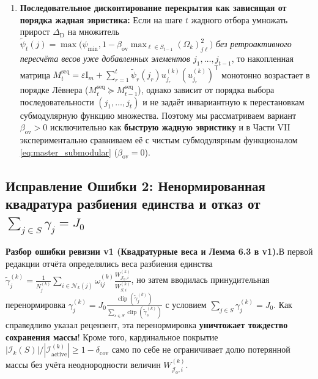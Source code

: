 \documentclass[11pt,a4paper]{article}
\newcommand{\Id}{\mathrm{I}}
\newcommand{\T}{^{\mathsf{T}}}
\newcommand{\II}{\mathcal{I}}
\newcommand{\JJJ}{\mathcal{J}}
\DeclareMathOperator{\clip}{clip}
\theoremstyle{definition}
\theoremstyle{remark}
\newcommand{\auditbox}[2]{%
  \vspace{6pt}\noindent\colorbox{warnbg}{%
    \parbox{\dimexpr\textwidth-2\fboxsep\relax}{%
      \vspace{4pt}\textbf{\color{accent}#1.}\hspace{0.4em}#2\vspace{4pt}%
    }%
  }\vspace{6pt}%
}
\begin{document}
\begin{enumerate}
    \begin{equation}\label{eq:marginal_gain}
        \Delta_{\mathrm{D}}^{\mathrm{exact}}(j \mid S_{t-1}) = \log\Bigl(1 + (u_j^{(k)})\T M_{t-1}^{-1} u_j^{(k)}\Bigr) \ge 0, \qquad \Delta_{\mathrm{mass}}(j \mid S_{t-1}) = \frac{\sum_{i \in \mathcal{N}_k(j) \setminus \II_k(S_{t-1})} W_{\JJJ_0, i}^{(k)}}{\sum_{i \in \II_{\mathrm{active}}^{(k)}} W_{\JJJ_0, i}^{(k)}} \ge 0.
    \end{equation}
    Заметим, что пространственное разнесение центров в \eqref{eq:master_submodular} достигается \emph{естественным субмодулярным путём}: если центр $j$ дублирует уже выбранный центр $\ell \in S_{t-1}$ ($\mathcal{N}_k(j) = \mathcal{N}_k(\ell)$), то его прирост покрытия тождественно равен нулю ($\Delta_{\mathrm{mass}}(j \mid S_{t-1}) = 0$), тогда как непокрытые области получают положительный бонус $\nu_{\mathrm{cov}} \Delta_{\mathrm{mass}}(j \mid S_{t-1}) > 0$!
    \item \textbf{Последовательное дисконтирование перекрытия как зависящая от порядка жадная эвристика:}
    Если на шаге $t$ жадного отбора умножать прирост $\Delta_{\mathrm{D}}$ на множитель $\tilde{\psi}_t(j) = \max\bigl(\psi_{\min}, 1 - \beta_{\mathrm{ov}}\max_{\ell \in S_{t-1}}(\Omega_k)_{j\ell}^2\bigr)$ \emph{без ретроактивного пересчёта весов уже добавленных элементов $j_1, \ldots, j_{t-1}$}, то накопленная матрица $M_t^{\mathrm{seq}} = \varepsilon \Id_m + \sum_{r=1}^t \tilde{\psi}_r(j_r) u_{j_r}^{(k)}(u_{j_r}^{(k)})\T$ монотонно возрастает в порядке Лёвнера ($M_t^{\mathrm{seq}} \succeq M_{t-1}^{\mathrm{seq}}$), однако зависит от порядка выбора последовательности $(j_1, \ldots, j_t)$ и не задаёт инвариантную к перестановкам субмодулярную функцию множества. Поэтому мы рассматриваем вариант $\beta_{\mathrm{ov}} > 0$ исключительно как \textbf{быструю жадную эвристику} и в Части VII экспериментально сравниваем её с чистым субмодулярным функционалом \eqref{eq:master_submodular} ($\beta_{\mathrm{ov}} = 0$).
\end{enumerate}

\subsection{Исправление Ошибки 2: Ненормированная квадратура разбиения единства и отказ от $\sum_{j \in S}\gamma_j = J_0$}

\auditbox{Разбор ошибки ревизии v1 (Квадратурные веса и Лемма 6.3 в v1)}{В первой редакции отчёта определялись веса разбиения единства $\tilde{\gamma}_j^{(k)} = \frac{1}{N_j^{(k)}}\sum_{i \in \mathcal{N}_k(j)} \omega_{ij}^{(k)} \frac{W_{\JJJ_0, i}^{(k)}}{W_{S, i}^{(k)}}$, но затем вводилась принудительная перенормировка $\gamma_j^{(k)} = J_0 \frac{\clip(\tilde{\gamma}_j^{(k)})}{\sum_{s \in S}\clip(\tilde{\gamma}_s^{(k)})}$ с условием $\sum_{j \in S}\gamma_j^{(k)} = J_0$. Как справедливо указал рецензент, эта перенормировка \textbf{уничтожает тождество сохранения массы}! Кроме того, кардинальное покрытие $|\II_k(S)|/|\II_{\mathrm{active}}^{(k)}| \ge 1 - \delta_{\mathrm{cov}}$ само по себе не ограничивает долю потерянной массы без учёта неоднородности величин $W_{\JJJ_0, i}^{(k)}$.}
\end{document}
